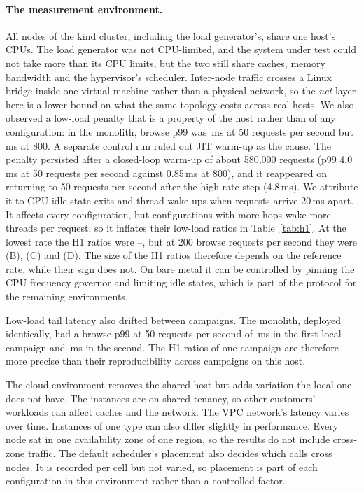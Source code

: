 \paragraph{The measurement environment.} All nodes of the kind cluster, including the load generator's, share
one host's CPUs. The load generator was not CPU-limited, and the system under test could not take more than its
CPU limits, but the two still share caches, memory bandwidth and the hypervisor's scheduler. Inter-node traffic
crosses a Linux bridge inside one virtual machine rather than a physical network, so the \emph{net} layer here is
a lower bound on what the same topology costs across real hosts. We also observed a low-load penalty that is a
property of the host rather than of any configuration: in the monolith, browse p99 was \,ms at 50 requests per second but
\,ms at 800. A separate control run ruled out JIT warm-up as the cause. The penalty persisted
after a closed-loop warm-up of about 580{,}000 requests (p99 4.0\,ms at 50 requests per second against 0.85\,ms at
800), and it reappeared on returning to 50 requests per second after the high-rate step (4.8\,ms). We attribute it to CPU idle-state exits and thread wake-ups when requests arrive 20\,ms apart.
It affects every configuration, but configurations with more hops wake more threads per request, so it inflates
their low-load ratios in Table~\ref{tab:h1}. At the lowest rate the H1 ratios were
--, but at 200 browse requests per second they were  (B),
 (C) and  (D). The size of the H1 ratios therefore depends on the reference rate, while their sign does not. On bare metal it can be controlled by pinning the
CPU frequency governor and limiting idle states, which is part of the protocol for the remaining environments.

Low-load tail latency also drifted between campaigns. The monolith, deployed identically, had a browse p99 at
50 requests per second of \,ms in the first local campaign and \,ms in
the second. The H1 ratios of one campaign are therefore more precise than their reproducibility across campaigns
on this host.

The cloud environment removes the shared host but adds variation the local one does not have. The instances are
on shared tenancy, so other customers' workloads can affect caches and the network. The VPC network's latency
varies over time. Instances of one type can also differ slightly in performance. Every node sat in one
availability zone of one region, so the results do not include cross-zone traffic. The default scheduler's
placement also decides which calls cross nodes. It is recorded per cell but not varied, so placement is part of
each configuration in this environment rather than a controlled factor.

